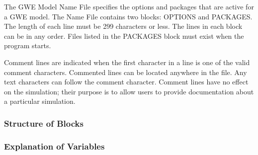 The GWE Model Name File specifies the options and packages that are active for a GWE model.  The Name File contains two blocks: OPTIONS  and PACKAGES. The length of each line must be 299 characters or less. The lines in each block can be in any order.  Files listed in the PACKAGES block must exist when the program starts. 

Comment lines are indicated when the first character in a line is one of the valid comment characters.  Commented lines can be located anywhere in the file. Any text characters can follow the comment character. Comment lines have no effect on the simulation; their purpose is to allow users to provide documentation about a particular simulation. 

\vspace{5mm}
\subsubsection{Structure of Blocks}



\vspace{5mm}
\subsubsection{Explanation of Variables}
\begin{description}

\end{description}

